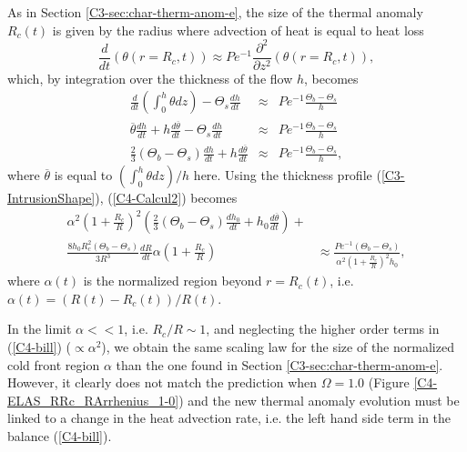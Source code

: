As in Section \ref{C3-sec:char-therm-anom-e},  the size of the thermal
anomaly $R_c(t)$  is given by  the radius  where advection of  heat is
equal to heat loss
\begin{equation}
  \frac{d}{d    t}\left(\theta(r=   R_c,t)\right)    \approx   Pe^{-1}
  \frac{\partial^2}{\partial z^2}\left(\theta(r=R_c,t)\right),
  \label{C4-HeatequationThermal}
\end{equation}
which, by integration over the thickness of the flow $h$, becomes
\begin{eqnarray}
  \frac{d}{dt}\left(\int_0^h\theta           dz\right)-\Theta_s\frac{d
  h}{dt}&\approx& Pe^{-1} \frac{\Theta_b-\Theta_s}{h}\nonumber\\
  \overline{\theta}\frac{d h}{dt}+h\frac{d \overline{\theta}}{dt}-\Theta_s\frac{d
  h}{dt}&\approx& Pe^{-1}
                  \frac{\Theta_b-\Theta_s}{h}\nonumber\\
  \frac{2}{3}\left(\Theta_b-\Theta_s\right)\frac{d h}{d t} +h\frac{d\overline{\theta}}{dt}&\approx& Pe^{-1}
                                                                                                    \frac{\Theta_b-\Theta_s}{h},\label{C4-Calcul2}
\end{eqnarray}
where $\overline{\theta}$  is equal to $(\int_0^h  \theta dz)/h$ here.
Using     the     thickness     profile     (\ref{C3-IntrusionShape}),
(\ref{C4-Calcul2}) becomes
\begin{eqnarray}
  \alpha^2\left(1+\frac{R_c}{R}\right)^2\left(\frac{2}{3}\left(\Theta_b-\Theta_s\right)\frac{d h_0}{d
  t}+h_0\frac{d \overline{\theta}}{d
  t}\right)+&\nonumber\\
  \frac{8h_0R_c^2\left(\Theta_b-\Theta_s\right)}{3R^3}\frac{d
  R}{d
  t}\alpha\left(1+\frac{R_c}{R}\right)                        &\approx
                                                                \frac{Pe^{-1}\left(\Theta_b-\Theta_s\right)}{\alpha^2\left(1+\frac{R_c}{R}\right)^2h_0},
                                                                \label{C4-bill}
\end{eqnarray}
where $\alpha  (t)$ is the  normalized region beyond  $r=R_c(t)$, i.e.
$\alpha(t)= \left(R(t)-R_c(t)\right)/R(t)$. 

In  the limit  $\alpha<<1$, i.e.   $R_c/R\sim 1$,  and neglecting  the
higher order terms in  (\ref{C4-bill}) ($\propto \alpha^2$), we obtain
the same scaling law for the  size of the normalized cold front region
$\alpha$ than the one found in Section \ref{C3-sec:char-therm-anom-e}.
However, it  clearly does not  match the prediction  when $\Omega=1.0$
(Figure \ref{C4-ELAS_RRc_RArrhenius_1-0}) and  the new thermal anomaly
evolution must be linked to a  change in the heat advection rate, i.e.
the left hand side term in the balance (\ref{C4-bill}).  

